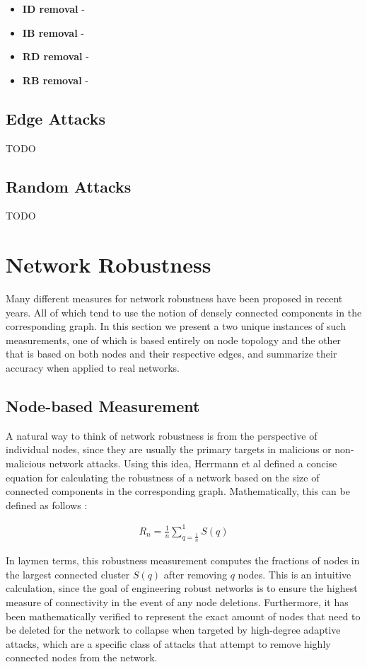 \documentclass[11pt]{article}
\begin{document}
\begin{itemize}
	\item \textbf{ID removal} - 
	\item \textbf{IB removal} - 
	\item \textbf{RD removal} - 
	\item \textbf{RB removal} - 
\end{itemize}

\subsection{Edge Attacks}
TODO

\subsection{Random Attacks}
TODO

\section{Network Robustness}

Many different measures for network robustness have been proposed in recent years. All of which tend
to use the notion of densely connected components in the corresponding graph. In this section we present
a two unique instances of such measurements, one of which is based entirely on node topology and the other that is based on both nodes and their respective edges, and summarize their accuracy when applied to real networks.

\subsection{Node-based Measurement}
A natural way to think of network robustness is from the perspective of individual nodes, since they are 
usually the primary targets in malicious or non-malicious network attacks. Using this idea, Herrmann et al
defined a concise equation for calculating the robustness of a network based on the size of connected
components in the corresponding graph. Mathematically, this can be defined as follows \cite{Onion}:

\begin{eqnarray*}
R_{n} = \frac{1}{n}\sum_{q=\frac{1}{n}}^{1}S(q)
\end{eqnarray*}

In laymen terms, this robustness measurement computes the fractions of nodes in the largest connected cluster $S(q)$ after removing $q$ nodes. This is an intuitive calculation, since the goal of engineering robust networks is to ensure the highest measure of connectivity in the event of any node deletions. Furthermore, it has been mathematically verified to represent the exact amount of nodes that need to be deleted for the network to collapse when targeted by high-degree adaptive attacks, which are a specific class of attacks that attempt to remove highly connected nodes from the network. 
\end{document}
